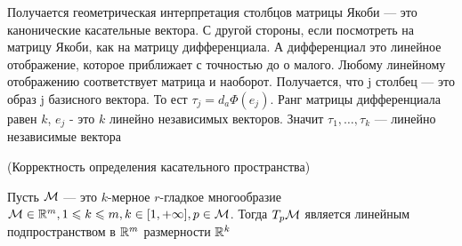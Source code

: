 Получается геометрическая интерпретация столбцов матрицы Якоби — это канонические касательные вектора. С другой стороны, если посмотреть на матрицу Якоби, как на матрицу дифференциала. А дифференциал это линейное отображение, которое приближает с точностью до о малого. Любому линейному отображению соответствует матрица и наоборот. Получается, что j столбец — это образ j базисного вектора. То ест $\tau_{j} = d_{a} \Phi (e_{j})$. Ранг матрицы дифференциала равен $k$, $e_j$ - это $k$ линейно независимых векторов. Значит $\tau_1, \dots, \tau_k$ — линейно независимые вектора

\begin{theorem} (Корректность определения касательного пространства)

Пусть $\mathcal{M}$ — это $k$-мерное $r$-гладкое многообразие $\mathcal{M} \in \mathbb{R}^{m}, 1 \leqslant k \leqslant m, k \in [1, +\infty], p \in \mathcal{M}$. Тогда $T_{p} \mathcal{M}$ является линейным подпространством в $\mathbb{R}^{m}$ размерности $\mathbb{R}^k$ 
\end{theorem}

